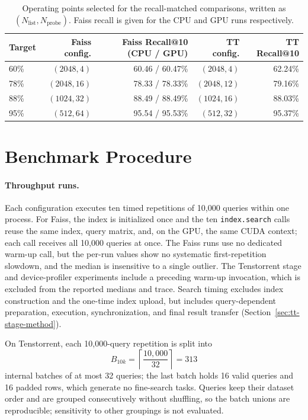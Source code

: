\begin{table}[htbp]
\centering
\caption{Operating points selected for the recall-matched comparisons, written
as \((N_{\mathrm{list}},N_{\mathrm{probe}})\). Faiss recall is given for the
CPU and GPU runs respectively.}
\label{tab:recall-matched-points}
\small
\setlength{\tabcolsep}{4pt}
\renewcommand{\arraystretch}{1.08}
\begin{tabular}{lrrrr}
\toprule
Target & Faiss config. & Faiss Recall@10 (CPU / GPU) & TT config. & TT Recall@10 \\
\midrule
60\% & \((2048,4)\)  & 60.46 / 60.47\% & \((2048,4)\)  & 62.24\% \\
78\% & \((2048,16)\) & 78.33 / 78.33\% & \((2048,12)\) & 79.16\% \\
88\% & \((1024,32)\) & 88.49 / 88.49\% & \((1024,16)\) & 88.03\% \\
95\% & \((512,64)\)  & 95.54 / 95.53\% & \((512,32)\)  & 95.37\% \\
\bottomrule
\end{tabular}
\end{table}

\section{Benchmark Procedure}
\label{sec:benchmark-procedure}

\paragraph{Throughput runs.}
Each configuration executes ten timed repetitions of 10,000 queries within one
process. For Faiss, the index is initialized once and the ten
\texttt{index.search} calls reuse the same index, query matrix, and, on the GPU, the same
CUDA context; each call receives all 10,000 queries at once. The Faiss runs use no dedicated warm-up call, but the per-run
values show no systematic first-repetition slowdown, and the median is
insensitive to a single outlier. The Tenstorrent stage and device-profiler
experiments include a preceding warm-up invocation, which is excluded from the
reported medians and trace. Search timing excludes index construction and the
one-time index upload, but includes query-dependent preparation, execution,
synchronization, and final result transfer
(Section~\ref{sec:tt-stage-method}).

On Tenstorrent, each 10,000-query repetition is split into
\begin{equation}
B_{10k}=\left\lceil\frac{10{,}000}{32}\right\rceil=313
\label{eq:tt-batches-per-repetition}
\end{equation}
internal batches of at most 32 queries; the last batch holds 16 valid queries
and 16 padded rows, which generate no fine-search tasks. Queries keep their
dataset order and are grouped consecutively without shuffling, so the batch
unions are reproducible; sensitivity to other groupings is not evaluated.

